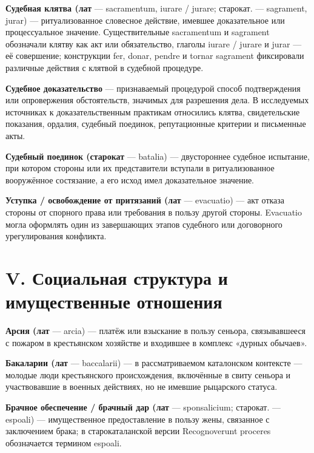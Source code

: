 \noindent\textbf{Судебная клятва (лат} --- sacramentum, iurare / jurare; старокат. --- sagrament, jurar) --- ритуализованное словесное действие, имевшее доказательное или процессуальное значение. Существительные sacramentum и sagrament обозначали клятву как акт или обязательство, глаголы iurare / jurare и jurar --- её совершение; конструкции fer, donar, pendre и tornar sagrament фиксировали различные действия с клятвой в судебной процедуре.
\par\medskip

\noindent\textbf{Судебное доказательство} --- признаваемый процедурой способ подтверждения или опровержения обстоятельств, значимых для разрешения дела. В исследуемых источниках к доказательственным практикам относились клятва, свидетельские показания, ордалия, судебный поединок, репутационные критерии и письменные акты.
\par\medskip

\noindent\textbf{Судебный поединок (старокат} --- batalia) --- двустороннее судебное испытание, при котором стороны или их представители вступали в ритуализованное вооружённое состязание, а его исход имел доказательное значение.
\par\medskip

\noindent\textbf{Уступка / освобождение от притязаний (лат} --- evacuatio) --- акт отказа стороны от спорного права или требования в пользу другой стороны. Evacuatio могла оформлять один из завершающих этапов судебного или договорного урегулирования конфликта.
\par\medskip

\section{V. Социальная структура и имущественные отношения}

\noindent\textbf{Арсия (лат} --- arcia) --- платёж или взыскание в пользу сеньора, связывавшееся с пожаром в крестьянском хозяйстве и входившее в комплекс «дурных обычаев».
\par\medskip

\noindent\textbf{Бакаларии (лат} --- baccalarii) --- в рассматриваемом каталонском контексте --- молодые люди крестьянского происхождения, включённые в свиту сеньора и участвовавшие в военных действиях, но не имевшие рыцарского статуса.
\par\medskip

\noindent\textbf{Брачное обеспечение / брачный дар (лат} --- sponsalicium; старокат. --- espoali) --- имущественное предоставление в пользу жены, связанное с заключением брака; в старокаталанской версии Recognoverunt proceres обозначается термином espoali.
\par\medskip

